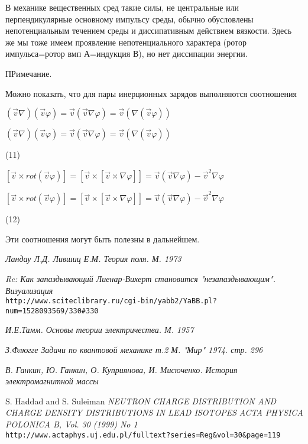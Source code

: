 \documentclass{article}
\begin{document}
В механике вещественных сред такие силы, не центральные или перпендикулярные основному импульсу среды, обычно обусловлены непотенциальным течением среды и диссипативным действием вязкости. Здесь же мы тоже имеем проявление непотенциального характера (ротор импульса=ротор вмп А=индукция В), но нет диссипации энергии.

ПРимечание.

Можно показать, что для пары инерционных зарядов выполняются соотношения

$(\vec v\nabla)(\vec v\varphi)=\vec v(\vec v\nabla\varphi)=\vec v(\nabla(\vec v\varphi))$

$(\vec v\nabla)(\vec v\varphi)=\vec v(\vec v\nabla\varphi)=\vec v(\nabla(\vec v\varphi))$

(11)

$[\vec v\times rot(\vec v\varphi)]=[\vec v\times[\vec v\times\nabla\varphi]]=\vec v(\vec v\nabla\varphi)-\vec v^2\nabla\varphi$

$[\vec v\times rot(\vec v\varphi)]=[\vec v\times[\vec v\times\nabla\varphi]]=\vec v(\vec v\nabla\varphi)-\vec v^2\nabla\varphi$

(12)

Эти соотношения могут быть полезны в дальнейшем. 



\begin{thebibliography}{99}

\textit{Ландау Л.Д. Лившиц Е.М. Теория поля. М. 1973}

\textit{Re: Как запаздывающий Лиенар-Вихерт становится "незапаздывающим". Визуализация}
\\\texttt{http://www.sciteclibrary.ru/cgi-bin/yabb2/YaBB.pl?num=1528093569/330\#330}

\textit{И.Е.Тамм. Основы теории электричества. М. 1957}

\textit{З.Флюгге Задачи по квантовой механике т.2 М. "Мир" 1974. стр. 296}

\textit{В. Ганкин, Ю. Ганкин, О. Куприянова, И. Мисюченко. История электромагнитной массы}


S. Haddad and S. Suleiman
\textit{NEUTRON CHARGE DISTRIBUTION AND CHARGE DENSITY DISTRIBUTIONS IN LEAD ISOTOPES}
\textit{ACTA PHYSICA POLONICA B, Vol. 30 (1999) No 1}
\\\texttt{http://www.actaphys.uj.edu.pl/fulltext?series=Reg\&vol=30\&page=119}



\end{thebibliography}
\end{document}
